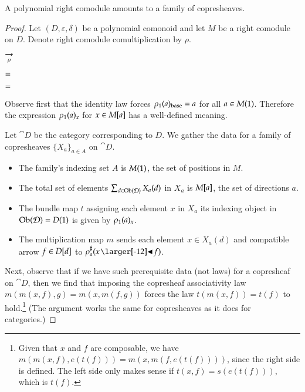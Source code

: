 \documentclass{amsart}
\begin{document}
\begin{prop}
  A polynomial right comodule amounts to a family of copresheaves.
\end{prop}
\begin{proof}
  Let $(D, \varepsilon, \delta)$ be a polynomial comonoid and let
  $M$ be a right comodule on $D$. Denote right comodule
  comultiplication by $\rho$.

  \begin{center}
    
    \hspace{-.75em}
    $\underset{\rho}{\to}$
    \hspace{.5em}
    
  \end{center}

  \begin{center}
    
    $=$
    \quad
    
  \end{center}

  \begin{center}
    
    \quad
    $=$
    \quad
    
  \end{center}

  Observe first that the identity law forces ${\rho}_1(a)_{\mathrm{base}} = a$
  for all $a \in M(1)$.
  Therefore the expression ${\rho}_1(a)_x$ for $x \in M[a]$ has a
  well-defined meaning.

  Let $\cat{D}$ be the category corresponding to $D$. We gather the
  data for a family of copresheaves $\{X_a\}_{a \in A}$ on $\cat{D}$.
  \begin{itemize}
  \item The family's indexing set $A$ is $M(1)$, the set
    of positions in $M$.
  \item The total set of elements $\sum_{d \in \operatorname{Ob}(\mathcal{D})}X_a(d)$ in
    $X_a$ is $M[a]$, the set of directions $a$.
  \item The bundle map $t$ assigning each element $x$ in $X_a$ its indexing
    object in $\operatorname{Ob}(\mathcal{D}) = D(1)$ is given by ${\rho}_1(a)_x$.
  \item The multiplication map $m$ sends each element $x \in X_a(d)$ and compatible
    arrow $f \in D[d]$ to $\dirmap{\rho}{a}{x \subd f}$.
  \end{itemize}
  
  Next, observe that if we have such prerequisite data (not laws) for
  a copresheaf on $\cat{D}$, then we find that imposing the copresheaf
  associativity law $m(m(x, f), g) = m(x, m(f, g))$ forces the law
  $t(m(x,f)) = t(f)$ to hold.\footnote{Given that $x$ and $f$ are
    composable, we have $m(m(x,f),e(t(f))) = m(x,m(f,e(t(f))))$, since
    the right side is defined. The left side only makes sense if
    $t(x,f) = s(e(t(f)))$, which is $t(f)$.} (The argument works the same
  for copresheaves as it does for categories.)


\end{proof}
\end{document}
